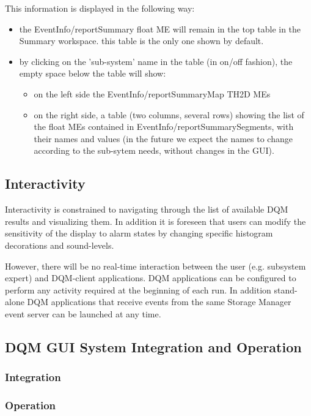 This information is displayed in the following way:
\begin{itemize}
\item the EventInfo/reportSummary float ME will remain in the top table in the Summary workspace. this table is the only one shown by default.
\item by clicking on the 'sub-system' name in the table (in on/off fashion), the empty space below the table will show:
\begin{itemize}
\item on the left side the EventInfo/reportSummaryMap TH2D MEs
\item on the right side, a table (two columns, several rows) showing the list of the float MEs contained in EventInfo/reportSummarySegments, with their names and values (in the future we expect the names to change according to the sub-sytem needs, without changes in the GUI).
\end{itemize}
\end{itemize}

\subsection{Interactivity}

Interactivity is constrained to navigating through the list of available DQM results and visualizing them. In addition it is foreseen that users can modify the sensitivity of the display to alarm states by changing specific histogram decorations and sound-levels.

However, there will be no real-time interaction between the user (e.g. subsystem expert) and DQM-client applications. DQM applications can be configured to perform any activity required at the beginning of each run. In addition stand-alone DQM applications that receive events from the same Storage Manager event server can be launched at any time. 

\subsection{DQM GUI System Integration and Operation}

\subsubsection*{Integration}
\subsubsection*{Operation}
